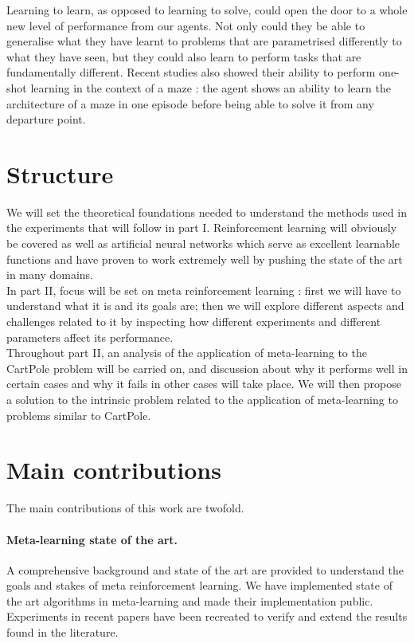 Learning to learn, as opposed to learning to solve, could open the door to a
whole new level of performance from our agents. Not only could they 
be able to generalise what they have learnt to problems that are parametrised
differently to what they have seen, but they could also learn to perform
tasks that are fundamentally different. Recent studies \cite{learningtorl,
fastrlviaslowrl} also showed their ability to perform one-shot learning in
the context of a maze : the agent shows an ability to learn the architecture
of a maze in one episode before being able to solve it from any departure point.


\section{Structure}
We will set the theoretical foundations needed to understand the methods used
in the experiments that will follow in part I. Reinforcement learning will
obviously be covered as well as artificial neural networks which serve as 
excellent learnable functions and have proven to work extremely well by
pushing the state of the art in many domains.\\

In part II, focus will be set on meta reinforcement learning : first we will
have to understand what it is and its goals are; then we will explore different
aspects and challenges related to it by inspecting how different experiments
and different parameters affect its performance.\\

Throughout part II, an analysis of the application of meta-learning to the
CartPole problem will be carried on, and discussion about why it performs
well in certain cases and why it fails in other cases will take place. We will
then propose a solution to the intrinsic problem related to the application
of meta-learning to problems similar to CartPole.


\section{Main contributions}
The main contributions of this work are twofold.

\paragraph{Meta-learning state of the art.}
A comprehensive background and state of the art are
provided to understand the goals and stakes of meta reinforcement learning.
We have implemented state of the art algorithms in meta-learning and made
their implementation public. Experiments in recent papers have been
recreated to verify and extend the results found in the literature.

